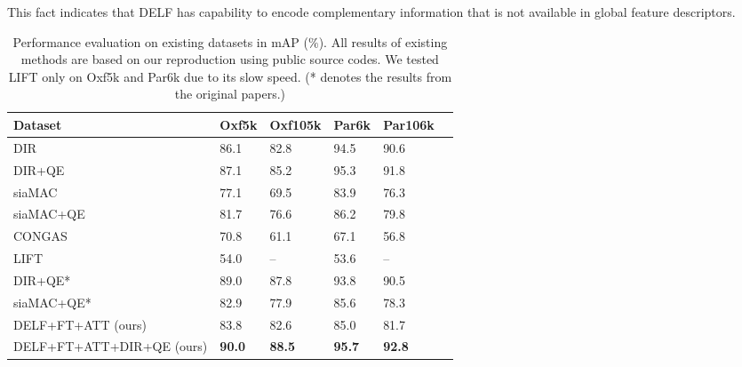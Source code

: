 \documentclass[10pt,twocolumn,letterpaper]{article}
\begin{document}
This fact indicates that DELF has capability to encode complementary information that is not available in global feature descriptors.\begin{table}[t]
\footnotesize                                                                                                                                                                                                                
\centering     
\caption{Performance evaluation on existing datasets in mAP ($\%$).  All results of existing methods are based on our reproduction using public source codes.  We tested LIFT only on Oxf5k and Par6k due to its slow speed.  (* denotes the results from the original papers.)}
\vspace{-5pt}
\begin{tabular}{@{\hskip0.0pt}l@{\hskip2.5pt}|C{0.7cm}C{0.7cm}C{0.7cm}C{0.7cm}l@{\hskip0.0pt}}         
  \toprule                                                                                                                                                                                                                                                                      
Dataset & Oxf5k & Oxf105k & Par6k & Par106k \\     
  \midrule     
DIR~\cite{gordo2016deep} & 86.1 &  82.8   &    94.5     &     90.6   \\
DIR+QE~\cite{gordo2016deep} & 87.1 & 85.2 &   95.3    &   91.8   \\
siaMAC~\cite{radenovic2016cnn} & 77.1 & 69.5   & 83.9     & 76.3      \\
siaMAC+QE~\cite{radenovic2016cnn} & 81.7 & 76.6   & 86.2         &  79.8      \\
CONGAS~\cite{buddemeier2012systems} & 70.8 & 61.1 & 67.1 &  56.8  \\
LIFT~\cite{yi2016lift} & 54.0 & -- & 53.6 &  --  \\
\midrule
DIR+QE*~\cite{gordo2016deep} & 89.0 & 87.8 &   93.8     &   90.5   \\
siaMAC+QE*~\cite{radenovic2016cnn} & 82.9 & 77.9   & 85.6         &  78.3      \\
\midrule
DELF+FT+ATT (ours) & 83.8 & 82.6 & 85.0 & 81.7 \\
DELF+FT+ATT+DIR+QE (ours) & {\bf 90.0} & {\bf 88.5} & {\bf 95.7} & {\bf 92.8} \\
  \bottomrule            
\end{tabular}                                                                                                                                                                                                                                                                        
\label{tab:100k_results}    
\vspace{-10pt}                                                                                                                                                                                                           
\end{table}
 
\end{document}
